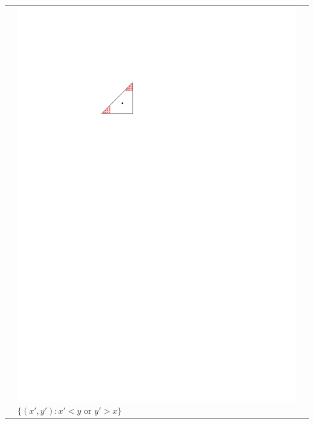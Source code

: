\documentclass{patmorin}
\begin{document}
\begin{table}
\begin{center}
\begin{tabular}{m{1ex}|>{\centering\arraybackslash}m{}|>{\centering\arraybackslash}m{}}
           & \includegraphics[scale=.8]{figs/killersb-3} \break%
             $\{(x',y'): x' < y\text{ or } y'> x\}$ \\

\end{tabular}
\end{center}
\end{table}
\end{document}

